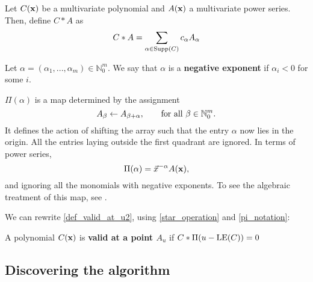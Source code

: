 \documentclass[12pt]{article}
\renewcommand{\vec}[1]{\textup{\textbf{#1}}}
\renewcommand{\le}{\textup{LE}}
\newcommand{\supp}{\textup{Supp}}
\theoremstyle{definition}
\theoremstyle{definition}
\theoremstyle{definition}
\theoremstyle{plain}
\theoremstyle{plain}
\numberwithin{equation}{section}
\newenvironment{customdef}[1]
  {\renewcommand\theinnercustomdef{#1}\innercustomdef}
  {\endinnercustomdef}
\newenvironment{customnot}[1]
  {\renewcommand\theinnercustomnot{#1}\innercustomnot}
  {\endinnercustomnot}
\begin{document}
\begin{customdef}{A.3}\label{star_operation}
    Let $C(\vec{x})$ be a multivariate polynomial and $A(\vec{x})$ a multivariate power series. 
    Then, define $C * A$ as
    \[
        C * A = \sum_{\alpha \in \supp(C)} c_\alpha A_\alpha
    \]
\end{customdef}


\begin{customdef}{A.4}
    Let $\alpha = (\alpha_1, ..., \alpha_m) \in \mathbb{N}_0^m$. 
    We say that $\alpha$ is a \textbf{negative exponent} if $\alpha_i < 0$ for some $i$.
\end{customdef}


\begin{customnot}{A.5}\label{pi_notation}
    $\Pi(\alpha)$ is a map determined by the assignment
    \[
        A_\beta \leftarrow A_{\beta + \alpha}, \qquad\textup{for all } \beta \in \mathbb{N}_0^m.
    \]
    It defines the action of shifting the array such that the entry $\alpha$ now lies in the origin. 
    All the entries laying outside the first quadrant are ignored. 
    In terms of power series,
    \[
        \Pi(\alpha) = \Vec{x}^{-\alpha}A(\vec{x}),
    \]
    and ignoring all the monomials with negative exponents. 
    To see the algebraic treatment of this map, see \cite{rubio2016finding}.
\end{customnot}


We can rewrite \cref{def_valid_at_u2}, using \cref{star_operation} and \cref{pi_notation}:


\begin{customdef}{A.6}\label{convolution}
    A polynomial $C(\vec{x})$ is \textbf{valid at a point $A_u$} if $C * \Pi(u-\le(C)) = 0$
\end{customdef}



\subsection*{Discovering the algorithm}
\end{document}
